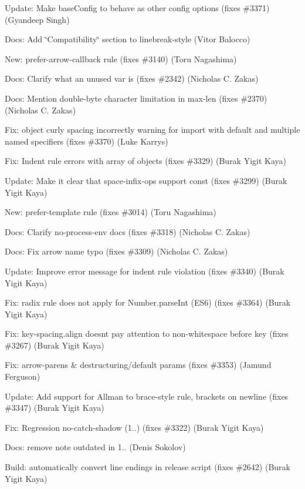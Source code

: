\begin{DoxyItemize}
\item Update\+: Make {\ttfamily base\+Config} to behave as other config options (fixes \#3371) (Gyandeep Singh)
\item Docs\+: Add \char`\"{}\+Compatibility\char`\"{} section to linebreak-\/style (Vitor Balocco)
\item New\+: {\ttfamily prefer-\/arrow-\/callback} rule (fixes \#3140) (Toru Nagashima)
\item Docs\+: Clarify what an unused var is (fixes \#2342) (Nicholas C. Zakas)
\item Docs\+: Mention double-\/byte character limitation in max-\/len (fixes \#2370) (Nicholas C. Zakas)
\item Fix\+: object curly spacing incorrectly warning for import with default and multiple named specifiers (fixes \#3370) (Luke Karrys)
\item Fix\+: Indent rule errors with array of objects (fixes \#3329) (Burak Yigit Kaya)
\item Update\+: Make it clear that {\ttfamily space-\/infix-\/ops} support {\ttfamily const} (fixes \#3299) (Burak Yigit Kaya)
\item New\+: {\ttfamily prefer-\/template} rule (fixes \#3014) (Toru Nagashima)
\item Docs\+: Clarify {\ttfamily no-\/process-\/env} docs (fixes \#3318) (Nicholas C. Zakas)
\item Docs\+: Fix arrow name typo (fixes \#3309) (Nicholas C. Zakas)
\item Update\+: Improve error message for {\ttfamily indent} rule violation (fixes \#3340) (Burak Yigit Kaya)
\item Fix\+: radix rule does not apply for Number.\+parse\+Int (E\+S6) (fixes \#3364) (Burak Yigit Kaya)
\item Fix\+: {\ttfamily key-\/spacing.\+align} doesn\textquotesingle{}t pay attention to non-\/whitespace before key (fixes \#3267) (Burak Yigit Kaya)
\item Fix\+: arrow-\/parens \& destructuring/default params (fixes \#3353) (Jamund Ferguson)
\item Update\+: Add support for Allman to brace-\/style rule, brackets on newline (fixes \#3347) (Burak Yigit Kaya)
\item Fix\+: Regression no-\/catch-\/shadow (1..) (fixes \#3322) (Burak Yigit Kaya)
\item Docs\+: remove note outdated in 1.. (Denis Sokolov)
\item Build\+: automatically convert line endings in release script (fixes \#2642) (Burak Yigit Kaya)

\end{DoxyItemize}
